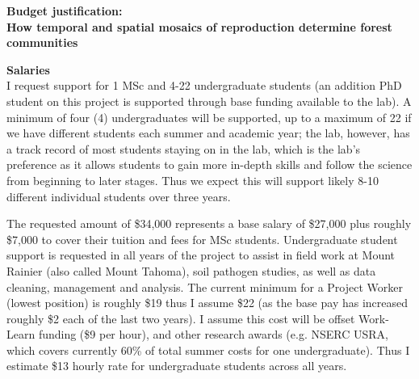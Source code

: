 \documentclass[12pt,oneside]{article}
\begin{document}
% 
\renewcommand{\labelitemi}{$\textendash$}
\begin{center}
{\bf Budget justification: \\How temporal and spatial mosaics of reproduction determine forest communities}
\vspace{-0.5ex}
\end{center}
{\bf Salaries}\\
I request support for 1 MSc and 4-22 undergraduate students (an addition PhD student on this project is supported through base funding available to the lab). A minimum of four (4) undergraduates will be supported, up to a maximum of 22 if we have different students each summer and academic year; the lab, however, has a track record of most students staying on in the lab, which is the lab's preference as it allows students to gain more in-depth skills and follow the science from beginning to later stages. Thus we expect this will support likely 8-10 different individual students over three years. 

The requested amount of \$34,000  represents a base salary of \$27,000 plus roughly \$7,000 to cover their tuition and fees for MSc students. Undergraduate student support is requested in all years of the project to assist in field work at Mount Rainier (also called Mount Tahoma), soil pathogen studies, as well as data cleaning, management and analysis. The current minimum for a Project Worker (lowest position) is roughly \$19 thus I assume \$22 (as the base pay has increased roughly \$2 each of the last two years). I assume this cost will be offset Work-Learn funding (\$9 per hour), and other research awards (e.g. NSERC USRA, which covers currently 60\% of total summer costs for one undergraduate). Thus I estimate \$13 hourly rate for undergraduate students across all years. 
\end{document}
